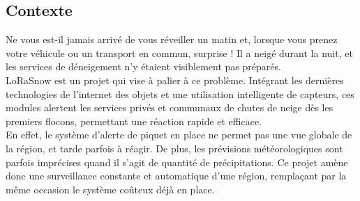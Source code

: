 \begin{summary}
\section{Contexte}

Ne vous est-il jamais arrivé de vous réveiller un matin et, lorsque vous prenez votre véhicule ou un 
transport en commun, surprise ! Il a neigé durant la nuit, et les services de déneigement n'y étaient
visiblement pas préparés.\\
LoRaSnow est un projet qui vise à palier à ce problème. Intégrant les dernières technologies de l'internet 
des objets et une utilisation intelligente de capteurs, ces modules alertent les services privés et
communaux de chutes de neige dès les premiers flocons, permettant une réaction rapide et efficace.\\
En effet, le système d'alerte de piquet en place ne permet pas une vue globale de la région, et tarde
parfois à réagir. De plus, les prévisions météorologiques sont parfois imprécises quand il s'agit de 
quantité de précipitations. Ce projet amène donc une surveillance constante et automatique d'une région,
remplaçant par la même occasion le système coûteux déjà en place.

\end{summary}